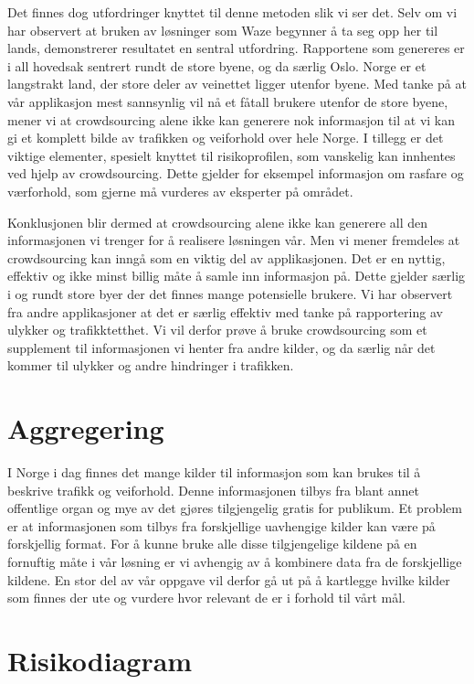 \documentclass[a4paper,norsk,oneside]{book}
\begin{document}
Det finnes dog utfordringer knyttet til denne metoden slik vi ser det. Selv om vi har observert at bruken av løsninger som Waze begynner å ta seg opp her til lands, demonstrerer resultatet en sentral utfordring. Rapportene som genereres er i all hovedsak sentrert rundt de store byene, og da særlig Oslo. Norge er et langstrakt land, der store deler av veinettet ligger utenfor byene. Med tanke på at vår applikasjon mest sannsynlig vil nå et fåtall brukere utenfor de store byene, mener vi at crowdsourcing alene ikke kan generere nok informasjon til at vi kan gi et komplett bilde av trafikken og veiforhold over hele Norge. I tillegg er det viktige elementer,  spesielt  knyttet til risikoprofilen, som vanskelig kan innhentes ved hjelp av crowdsourcing. Dette gjelder for eksempel informasjon om rasfare og værforhold, som gjerne må vurderes av eksperter på området.

Konklusjonen blir dermed at crowdsourcing alene ikke kan generere all den informasjonen vi trenger for å realisere løsningen vår. Men vi mener fremdeles at crowdsourcing kan inngå som en viktig del av applikasjonen. Det er en nyttig, effektiv og ikke minst billig måte å samle inn informasjon på. Dette gjelder særlig i og rundt store byer der det finnes mange potensielle brukere. Vi har observert fra andre applikasjoner at det er særlig effektiv med tanke på rapportering av ulykker og trafikktetthet. Vi vil derfor prøve å bruke crowdsourcing som et supplement til informasjonen vi henter fra andre kilder, og da særlig når det kommer til ulykker og andre hindringer i trafikken.


\section{Aggregering}
\label{sec:Aggregering}

I Norge i dag finnes det mange kilder til informasjon som kan brukes til å beskrive trafikk og veiforhold. Denne informasjonen tilbys fra blant annet offentlige organ og mye av det gjøres tilgjengelig gratis for publikum. Et problem er at informasjonen som tilbys fra forskjellige uavhengige kilder kan være på forskjellig format. For å kunne bruke alle disse tilgjengelige kildene på en fornuftig måte i vår løsning er vi avhengig av å kombinere data fra de forskjellige kildene. En stor del av vår oppgave vil derfor gå ut på å kartlegge hvilke kilder som finnes der ute og vurdere hvor relevant de er i forhold til vårt mål.

\section{Risikodiagram}
\label{sec:risikodiagram}
\end{document}
